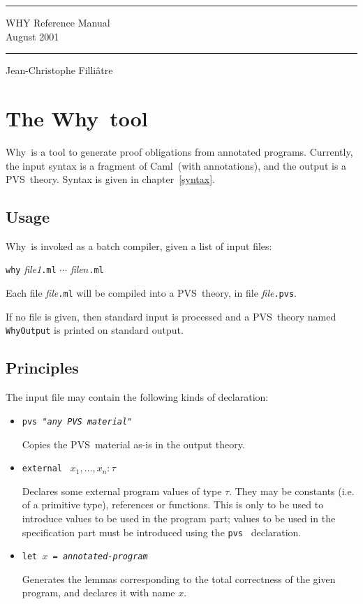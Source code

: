 \documentclass[12pt]{report}
\newcommand{\caml}{\textsf{Caml}}
\newcommand{\pvs}{\textsf{PVS}}
\newcommand{\why}{\textsf{Why}}
\newcommand{\te}[1]{\texttt{#1}~}
\begin{document}
\thispagestyle{empty}
\begin{center}
\vfill
\rule\textwidth{0.1cm}\\[0.3cm]
{\Huge\sf WHY Reference Manual}\\[0.5cm]
{\large August 2001}\\
\rule\textwidth{0.1cm}
\vfill
\noindent Jean-Christophe Filli\^atre
\vfill
\end{center}

\tableofcontents

\chapter{The \why\ tool}

\why\ is a tool to generate proof obligations from annotated programs.
Currently, the input syntax is a fragment of \caml\ (with annotations),
and the output is a \pvs\ theory. Syntax is given in chapter~\ref{syntax}.


\section{Usage}

\why\ is invoked as a batch compiler, given a list of input files:
\begin{center}
  \texttt{why} \textit{file1}\texttt{.ml} $\cdots$
    \textit{file$n$}\texttt{.ml}
\end{center}
Each file \textit{file}\texttt{.ml} will be compiled into a \pvs\ theory,
in file \textit{file}\texttt{.pvs}.

If no file is given, then standard input is processed and a \pvs\ theory
named \texttt{WhyOutput} is printed on standard output.


\section{Principles}

The input file may contain the following kinds of declaration:
\begin{itemize}
  \item \te{pvs "\textit{any \pvs\ material}"} \par
    Copies the \pvs\ material as-is in the output theory.

  \item \te{external} $x_1,\dots,x_n: \tau$ \par 
    Declares some external program values of type $\tau$.
    They may be constants (i.e. of a primitive type), references 
    or functions. This is only to be used to introduce values to be used
    in the program part; values to be used in the specification part
    must be introduced using the \te{pvs} declaration.

  \item \te{let $x$ = \textit{annotated-program}} \par
    Generates the lemmas corresponding to the total correctness of
    the given program, and declares it with name $x$.
\end{itemize}
\end{document}
